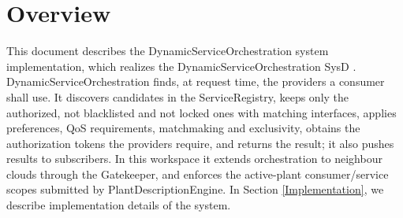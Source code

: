 \documentclass[a4paper]{arrowhead}
\begin{document}
\sloppy

\ArrowheadSetup

\begin{center}
  \vspace*{1cm}
  \huge{\arrowtitle}

  \vspace*{0.2cm}
  \LARGE{\arrowtype}
  \vspace*{1cm}

  \vspace*{\fill}


  \vspace*{1cm}
  \vspace*{\fill}

  \begin{abstract}
    This document describes the design and implementation of the DynamicServiceOrchestration core system of Arrowhead 5.2.2 in Java Spring (\texttt{ah5-core-java-spring/serviceorchestration-dynamic}).
  \end{abstract}

  \vspace*{1cm}
\end{center}

\newpage

\tableofcontents
\newpage

\section{Overview}
\label{sec:overview}

This document describes the DynamicServiceOrchestration system implementation, which realizes the DynamicServiceOrchestration SysD \cite{dso-sysd}. Dynamic\allowbreak{}Service\allowbreak{}Orchestration finds, at request time, the providers a consumer shall use. It discovers candidates in the ServiceRegistry, keeps only the authorized, not blacklisted and not locked ones with matching interfaces, applies preferences, QoS requirements, matchmaking and exclusivity, obtains the authorization tokens the providers require, and returns the result; it also pushes results to subscribers. In this workspace it extends orchestration to neighbour clouds through the Gatekeeper, and enforces the active-plant consumer/service scopes submitted by Plant\allowbreak{}Description\allowbreak{}Engine.
In Section \ref{Implementation}, we describe implementation details of the system.
\end{document}
